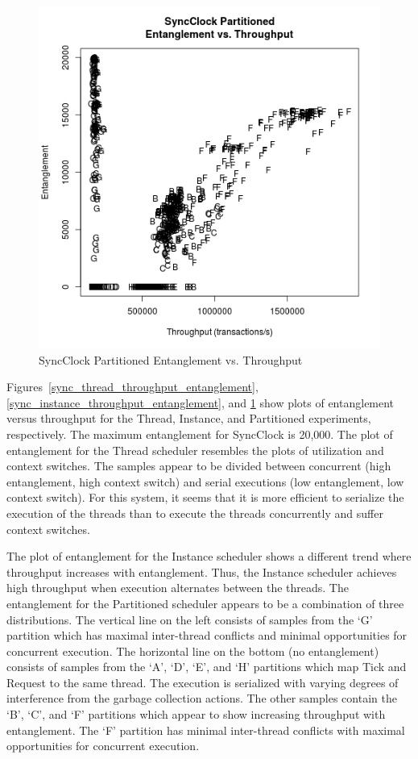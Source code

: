 \begin{figure}[H]
\center
\includegraphics[height=.4\textheight]{sync_partitioned_throughput_entanglement.png}
\caption{SyncClock Partitioned Entanglement vs. Throughput}
\label{sync_partitioned_throughput_entanglement}
\end{figure}

Figures~\ref{sync_thread_throughput_entanglement}, \ref{sync_instance_throughput_entanglement}, and \ref{sync_partitioned_throughput_entanglement} show plots of entanglement versus throughput for the Thread, Instance, and Partitioned experiments, respectively.
The maximum entanglement for SyncClock is 20,000.
The plot of entanglement for the Thread scheduler resembles the plots of utilization and context switches.
The samples appear to be divided between concurrent (high entanglement, high context switch) and serial executions (low entanglement, low context switch).
For this system, it seems that it is more efficient to serialize the execution of the threads than to execute the threads concurrently and suffer context switches.

The plot of entanglement for the Instance scheduler shows a different trend where throughput increases with entanglement.
Thus, the Instance scheduler achieves high throughput when execution alternates between the threads.
The entanglement for the Partitioned scheduler appears to be a combination of three distributions.
The vertical line on the left consists of samples from the `G' partition which has maximal inter-thread conflicts and minimal opportunities for concurrent execution.
The horizontal line on the bottom (no entanglement) consists of samples from the `A', `D', `E', and `H' partitions which map Tick and Request to the same thread.
The execution is serialized with varying degrees of interference from the garbage collection actions.
The other samples contain the `B', `C', and `F' partitions which appear to show increasing throughput with entanglement.
The `F' partition has minimal inter-thread conflicts with maximal opportunities for concurrent execution.

